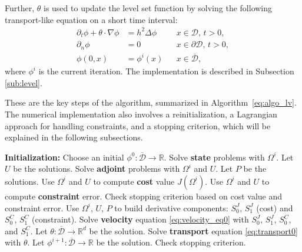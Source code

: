 \documentclass[iicol,pdflatex,sn-mathphys-ay]{sn-jnl}%
\theoremstyle{thmstyleone}%
\theoremstyle{thmstyletwo}%
\theoremstyle{thmstylethree}%
\begin{document}
Further, $\theta$ is used to update the level set function
by solving the following transport-like equation on a short time interval:
\begin{equation} \label{eq:transport0}
	\begin{aligned}
	\partial_t \phi+\theta\cdot\nabla\phi
		&= h^2\Delta\phi && x\in \mathcal{D},\, t>0, \\
	\partial_{n}\phi
		&= 0 && x\in \partial\mathcal{D},\, t>0, \\
	\phi(0, x)
		&= \phi^{i}(x) && x\in \overline{\mathcal{D}},
	\end{aligned}
\end{equation}
where $\phi^{i}$ is the current iteration.
The implementation is described in Subsection \ref{sub:level}.

These are the key steps of the algorithm,
summarized in Algorithm~\ref{eq:algo_lv}.
The numerical implementation also involves a reinitialization,
a Lagrangian approach for handling constraints, and a stopping criterion,
which will be explained in the following subsections.

\begin{algorithm}
\caption{Level set algorithm} \label{eq:algo_lv}
\small
\begin{algorithmic}[1]
\State \textbf{Initialization:}
Choose an initial $\phi^0:\overline{\mathcal{D}}\to\mathds{R}$.
\State Solve \textbf{state} problems with $\Omega^i$.
\Statex \hspace{1.2em} Let $U$ be the solutions.
\State Solve \textbf{adjoint} problems with $\Omega^i$ and $U$.
\Statex \hspace{1.2em} Let $P$ be the solutions.
\State Use $\Omega^i$ and $U$ to compute \textbf{cost} value $J(\Omega^i)$.
\State Use $\Omega^i$ and $U$ to compute \textbf{constraint} error.
\State Check stopping criterion based on cost value
\Statex \hspace{1.2em} and constraint error.
\State Use $\Omega^i$, $U$, $P$ to build derivative components:
\Statex \hspace{1.2em} $S_0^{J}$, $S_1^{J}$ (cost)%
		and $S_0^{C}$, $S_1^{C}$ (constraint).
\State Solve \textbf{velocity} equation \eqref{eq:velocity_eq0} with
\Statex \hspace{1.2em} $S_0^{J}$, $S_1^{J}$, $S_0^{C}$, and $S_1^{C}$.
\Statex \hspace{1.2em} %
Let $\theta\colon\overline{\mathcal{D}}\to\mathds{R}^d$ be the solution.
\State Solve \textbf{transport} equation \eqref{eq:transport0} with $\theta$.
\Statex \hspace{1.2em} %
Let $\phi^{i+1}\colon\overline{\mathcal{D}}\to\mathds{R}$ be the solution.
\State Check stopping criterion.
\EndFor
\end{algorithmic}
\end{algorithm}
\end{document}
